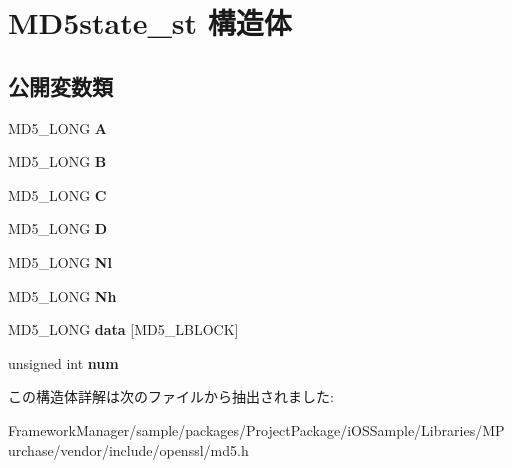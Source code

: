 \hypertarget{struct_m_d5state__st}{}\section{M\+D5state\+\_\+st 構造体}
\label{struct_m_d5state__st}
\subsection*{公開変数類}
\begin{DoxyCompactItemize}
\item 
\hypertarget{struct_m_d5state__st_ac01316cea74aeb98bb8d557f57c85a08}{}M\+D5\+\_\+\+L\+O\+N\+G {\bfseries A}\label{struct_m_d5state__st_ac01316cea74aeb98bb8d557f57c85a08}

\item 
\hypertarget{struct_m_d5state__st_a0a0927f6cc209cb0d4565a89af43e59c}{}M\+D5\+\_\+\+L\+O\+N\+G {\bfseries B}\label{struct_m_d5state__st_a0a0927f6cc209cb0d4565a89af43e59c}

\item 
\hypertarget{struct_m_d5state__st_a90da41912fea04ac78eb4c580744e79b}{}M\+D5\+\_\+\+L\+O\+N\+G {\bfseries C}\label{struct_m_d5state__st_a90da41912fea04ac78eb4c580744e79b}

\item 
\hypertarget{struct_m_d5state__st_a1bd5cc2fd46230a9b3ca542ce941447e}{}M\+D5\+\_\+\+L\+O\+N\+G {\bfseries D}\label{struct_m_d5state__st_a1bd5cc2fd46230a9b3ca542ce941447e}

\item 
\hypertarget{struct_m_d5state__st_accb86d088daeafde5a370fb8a2961bd7}{}M\+D5\+\_\+\+L\+O\+N\+G {\bfseries Nl}\label{struct_m_d5state__st_accb86d088daeafde5a370fb8a2961bd7}

\item 
\hypertarget{struct_m_d5state__st_a2eb6f766a15bf4987f75eda8f954e1f2}{}M\+D5\+\_\+\+L\+O\+N\+G {\bfseries Nh}\label{struct_m_d5state__st_a2eb6f766a15bf4987f75eda8f954e1f2}

\item 
\hypertarget{struct_m_d5state__st_a00b0904b7f53a7a3fc899f56af14d207}{}M\+D5\+\_\+\+L\+O\+N\+G {\bfseries data} \mbox{[}M\+D5\+\_\+\+L\+B\+L\+O\+C\+K\mbox{]}\label{struct_m_d5state__st_a00b0904b7f53a7a3fc899f56af14d207}

\item 
\hypertarget{struct_m_d5state__st_ae35c099cfb7bdf972b4419998c7efc92}{}unsigned int {\bfseries num}\label{struct_m_d5state__st_ae35c099cfb7bdf972b4419998c7efc92}

\end{DoxyCompactItemize}


この構造体詳解は次のファイルから抽出されました\+:\begin{DoxyCompactItemize}
\item 
Framework\+Manager/sample/packages/\+Project\+Package/i\+O\+S\+Sample/\+Libraries/\+M\+Purchase/vendor/include/openssl/md5.\+h\end{DoxyCompactItemize}
